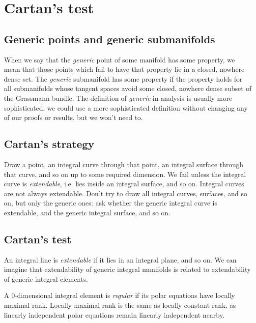 \chapter{Cartan's test}\label{chapter:test}
%
\section{Generic points and generic submanifolds}
When we say that the \emph{generic} point of some manifold has some property, we mean that those points which fail to have that property lie in a closed, nowhere dense set.
The \emph{generic} submanifold has some property if the property holds for all submanifolds whose tangent spaces avoid some closed, nowhere dense subset of the Grassmann bundle.
The definition of \emph{generic} in analysis is usually more sophisticated; we could use a more sophisticated definition without changing any of our proofs or results, but we won't need to.

\section{Cartan's strategy}
Draw a point, an integral curve through that point, an integral surface through that curve, and so on up to some required dimension.
We fail unless the integral curve is \emph{extendable}, i.e. lies inside an integral surface, and so on.
Integral curves are not always extendable.
Don't try to draw all integral curves, surfaces, and so on, but only the generic ones: ask whether the generic integral curve is extendable, and the generic integral surface, and so on.

\section{Cartan's test}
An integral line is \emph{extendable} if it lies in an integral plane, and so on.
We can imagine that extendability of generic integral manifolds is related to extendability of generic integral elements.

A \(0\)-dimensional integral element is \emph{regular} if its polar equations have locally maximal rank.
Locally maximal rank is the same as locally constant rank, as linearly independent polar equations remain linearly independent nearby.

